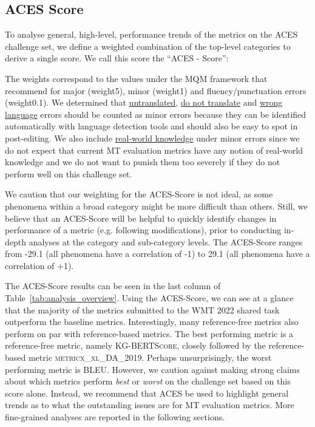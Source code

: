 \documentclass[11pt]{article}
\begin{document}
\subsection{ACES Score}

To analyse general, high-level, performance trends of the metrics on the \textsc{ACES} challenge set, we define a weighted combination of the top-level categories to derive a single score. We call this score the ``ACES - Score'':




The weights correspond to the values under the MQM framework that \citet{freitag-etal-2021-experts} recommend for major (weight5), minor (weight1) and fluency/punctuation errors (weight0.1). We determined that \hyperref[sec:untranslated]{untranslated}, \hyperref[sec:do-not-translate]{do not translate} and \hyperref[sec:wrong_language]{wrong language} errors should be counted as minor errors because they can be identified automatically with language detection tools and should also be easy to spot in post-editing. We also include \hyperref[sec:real-world-knowledge]{real-world knowledge} under minor errors since we do not expect that current MT evaluation metrics have any notion of real-world knowledge and we do not want to punish them too severely if they do not perform well on this challenge set. 



We caution that our weighting for the \textsc{ACES}-Score is not ideal, as some phenomena within a broad category might be more difficult than others. Still, we believe that an \textsc{ACES}-Score will be helpful to quickly identify changes in performance of a metric (e.g. following modifications), prior to conducting in-depth analyses at the category and sub-category levels. The \textsc{ACES}-Score ranges from -29.1 (all phenomena have a correlation of -1) to 29.1 (all phenomena have a correlation of +1).




The \textsc{ACES}-Score results can be seen in the last column of Table~\ref{tab:analysis_overview}. Using the \textsc{ACES}-Score, we can see at a glance that the majority of the metrics submitted to the WMT 2022 shared task outperform the baseline metrics. Interestingly, many reference-free metrics also perform on par with reference-based metrics. The best performing metric is a reference-free metric, namely \textsc{KG-BERTScore}, closely followed by the reference-based metric \textsc{metricx\_xl\_DA\_2019}. Perhaps unsurprisingly, the worst performing metric is \textsc{BLEU}. However, we caution against making strong claims about which metrics perform \textit{best} or \textit{worst} on the challenge set based on this score alone. Instead, we recommend that \textsc{ACES} be used to highlight general trends as to what the outstanding issues are for MT evaluation metrics. More fine-grained analyses are reported in the following sections.
\end{document}
